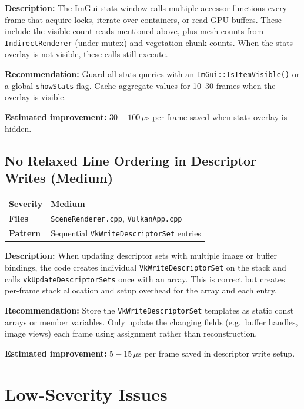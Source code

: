 \documentclass[a4paper,10pt]{article}
\newcommand{\us}{\ensuremath{\,\mu\text{s}}}
\newcommand{\severity}[1]{%
  \ifstrequal{#1}{Critical}{\textcolor{critical}{\textbf{#1}}}{%
  \ifstrequal{#1}{High}{\textcolor{high}{\textbf{#1}}}{%
  \ifstrequal{#1}{Medium}{\textcolor{medium}{\textbf{#1}}}{%
  \ifstrequal{#1}{Low}{\textcolor{low}{\textbf{#1}}}{#1}}}}}
\begin{document}
\vspace{0.5em}
\noindent
\textbf{Description:} The ImGui stats window calls multiple accessor functions
every frame that acquire locks, iterate over containers, or read GPU buffers.
These include the visible count reads mentioned above, plus mesh counts from
\texttt{IndirectRenderer} (under mutex) and vegetation chunk counts. When the
stats overlay is not visible, these calls still execute.

\noindent\textbf{Recommendation:} Guard all stats queries with an
\texttt{ImGui::IsItemVisible()} or a global \texttt{showStats} flag. Cache
aggregate values for 10--30 frames when the overlay is visible.

\noindent\textbf{Estimated improvement:} $30{-}100\us$ per frame saved when
stats overlay is hidden.

\subsection{No Relaxed Line Ordering in Descriptor Writes (Medium)}

\begin{tabular}{ll}
\textbf{Severity} & \severity{Medium} \\
\textbf{Files}     & \texttt{SceneRenderer.cpp}, \texttt{VulkanApp.cpp} \\
\textbf{Pattern}   & Sequential \texttt{VkWriteDescriptorSet} entries \\
\end{tabular}

\vspace{0.5em}
\noindent
\textbf{Description:} When updating descriptor sets with multiple image or
buffer bindings, the code creates individual \texttt{VkWriteDescriptorSet}
on the stack and calls \texttt{vkUpdateDescriptorSets} once with an array.
This is correct but creates per-frame stack allocation and setup overhead
for the array and each entry.

\noindent\textbf{Recommendation:} Store the \texttt{VkWriteDescriptorSet}
templates as static const arrays or member variables. Only update the
changing fields (e.g.\ buffer handles, image views) each frame using
assignment rather than reconstruction.

\noindent\textbf{Estimated improvement:} $5{-}15\us$ per frame saved in
descriptor write setup.

\section{Low-Severity Issues}
\end{document}
